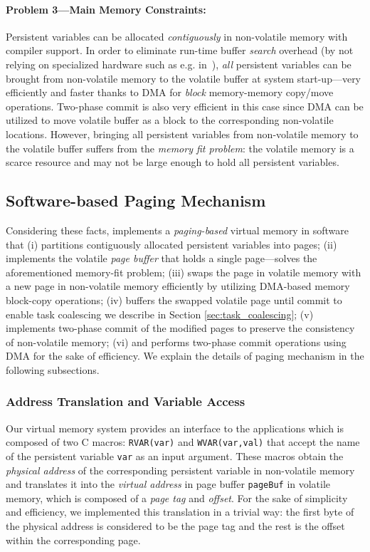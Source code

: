 \paragraph{Problem 3---Main Memory Constraints:} Persistent variables can be allocated \emph{contiguously} in non-volatile memory with compiler support. In order to eliminate run-time buffer \emph{search} overhead (by not relying on specialized hardware such as e.g. in~\cite{hicks_isca_2017}), \emph{all} persistent variables can be brought from non-volatile memory to the volatile buffer at system start-up---very efficiently and faster thanks to DMA for \emph{block} memory-memory copy/move operations. Two-phase commit is also very efficient in this case since DMA can be utilized to move volatile buffer as a block to the corresponding non-volatile locations. However, bringing all persistent variables from non-volatile memory to the volatile buffer suffers from the \emph{memory fit problem}: the volatile memory is a scarce resource and may not be large enough to hold all persistent variables.

\subsection{Software-based Paging Mechanism}
Considering these facts, \sys implements a \emph{paging-based} virtual memory in software that (i) partitions contiguously allocated persistent variables into pages; (ii) implements the volatile \emph{page buffer} that holds a single page---solves the aforementioned memory-fit problem; (iii) swaps the page in volatile memory with a new page in non-volatile memory efficiently by utilizing DMA-based memory block-copy operations; (iv) buffers the swapped volatile page until commit to enable task coalescing we describe in Section \ref{sec:task_coalescing}; (v) implements two-phase commit of the modified pages to preserve the consistency of non-volatile memory; (vi) and performs two-phase commit operations using DMA for the sake of efficiency. We explain the details of \sys paging mechanism in the following subsections.

\subsubsection{Address Translation and Variable Access}

Our virtual memory system provides an interface to the applications which is composed of two C macros: \texttt{RVAR(var)} and \texttt{WVAR(var,val)} that accept the name of the persistent variable \texttt{var} as an input argument. These macros obtain the \emph{physical address} of the corresponding persistent variable in non-volatile memory and translates it into the \emph{virtual address} in page buffer \texttt{pageBuf} in volatile memory, which is composed of a \emph{page tag} and \emph{offset}. For the sake of simplicity and efficiency, we implemented this translation in a trivial way: the first byte of the physical address is considered to be the page tag and the rest is the offset within the corresponding page. 

